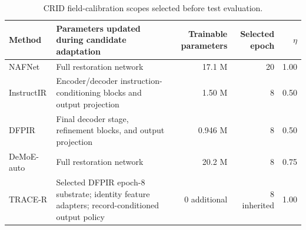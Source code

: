 \begin{table}[!t]
\centering
\caption{CRID field-calibration scopes selected before test evaluation.}
\label{tab:crid_adaptation_audit}
\scriptsize
\setlength{\tabcolsep}{3pt}
\begin{tabular}{lp{}rrr}
\toprule
Method & Parameters updated during candidate adaptation & Trainable parameters & Selected epoch & $\eta$ \\
\midrule
NAFNet & Full restoration network & 17.1 M & 20 & 1.00 \\
InstructIR & Encoder/decoder instruction-conditioning blocks and output projection & 1.50 M & 8 & 0.50 \\
DFPIR & Final decoder stage, refinement blocks, and output projection & 0.946 M & 8 & 0.50 \\
DeMoE-auto & Full restoration network & 20.2 M & 8 & 0.75 \\
TRACE-R & Selected DFPIR epoch-8 substrate; identity feature adapters; record-conditioned output policy & 0 additional & 8 inherited & 1.00 \\
\bottomrule
\end{tabular}
\end{table}
